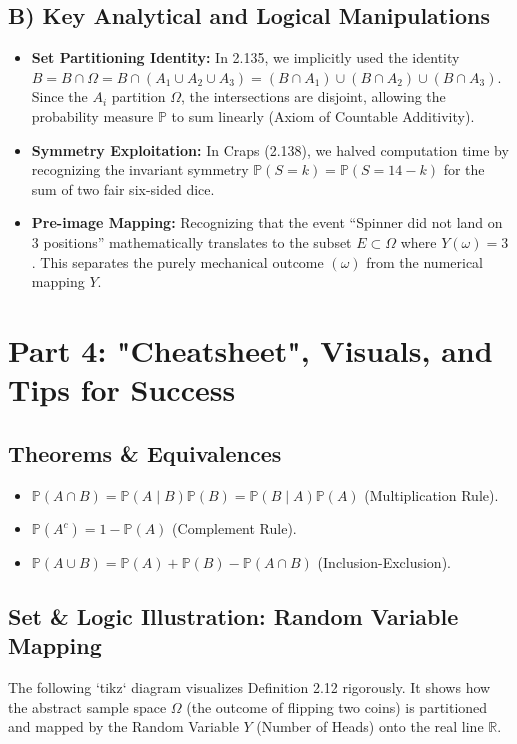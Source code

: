 \documentclass[11pt, letterpaper]{article}
\theoremstyle{definition}
\newcommand{\R}{\mathbb{R}}
\renewcommand{\P}{\mathbb{P}}
\begin{document}
\subsection{B) Key Analytical and Logical Manipulations}
\begin{itemize}
    \item \textbf{Set Partitioning Identity:} In 2.135, we implicitly used the identity $B = B \cap \Omega = B \cap (A_1 \cup A_2 \cup A_3) = (B \cap A_1) \cup (B \cap A_2) \cup (B \cap A_3)$. Since the $A_i$ partition $\Omega$, the intersections are disjoint, allowing the probability measure $\P$ to sum linearly (Axiom of Countable Additivity).
    \item \textbf{Symmetry Exploitation:} In Craps (2.138), we halved computation time by recognizing the invariant symmetry $\P(S = k) = \P(S = 14 - k)$ for the sum of two fair six-sided dice.
    \item \textbf{Pre-image Mapping:} Recognizing that the event ``Spinner did not land on 3 positions'' mathematically translates to the subset $E \subset \Omega$ where $Y(\omega) = 3$. This separates the purely mechanical outcome $(\omega)$ from the numerical mapping $Y$.
\end{itemize}

\section{Part 4: "Cheatsheet", Visuals, and Tips for Success}

\subsection{Theorems \& Equivalences}
\begin{itemize}
    \item $\P(A \cap B) = \P(A \mid B)\P(B) = \P(B \mid A)\P(A)$ (Multiplication Rule).
    \item $\P(A^c) = 1 - \P(A)$ (Complement Rule).
    \item $\P(A \cup B) = \P(A) + \P(B) - \P(A \cap B)$ (Inclusion-Exclusion).
\end{itemize}

\subsection{Set \& Logic Illustration: Random Variable Mapping}
The following `tikz` diagram visualizes Definition 2.12 rigorously. It shows how the abstract sample space $\Omega$ (the outcome of flipping two coins) is partitioned and mapped by the Random Variable $Y$ (Number of Heads) onto the real line $\R$.
\end{document}
